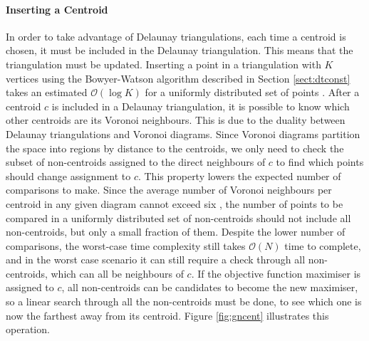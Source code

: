 \paragraph{Inserting a Centroid}
In order to take advantage of Delaunay triangulations, each time a centroid is chosen, it must be included in the Delaunay triangulation. This means that the triangulation must be updated. Inserting a point in a triangulation with $K$ vertices using the Bowyer-Watson algorithm described in Section \ref{sect:dtconst} takes an estimated $\mathcal{O}(\log{K})$ for a uniformly distributed set of points \cite{tricomplex}.
After a centroid $c$ is included in a Delaunay triangulation, it is possible to know which other centroids are its Voronoi neighbours. This is due to the duality between Delaunay triangulations and Voronoi diagrams.
Since Voronoi diagrams partition the space into regions by distance to the centroids, we only need to check the subset of non-centroids assigned to the direct neighbours of $c$ to find which points should change assignment to $c$. 
This property lowers the expected number of comparisons to make. Since the average number of Voronoi neighbours per centroid in any given diagram cannot exceed six \cite{tricard2,tricard1}, the number of points to be compared in a uniformly distributed set of non-centroids should not include all non-centroids, but only a small fraction of them.
Despite the lower number of comparisons, the worst-case time complexity still takes $\mathcal{O}(N)$ time to complete, and in the worst case scenario it can still require a check through all non-centroids, which can all be neighbours of $c$.
If the objective function maximiser is assigned to $c$, all non-centroids can be candidates to become the new maximiser, so a linear search through all the non-centroids must be done, to see which one is now the farthest away from its centroid. Figure \ref{fig:gncent} illustrates this operation.




